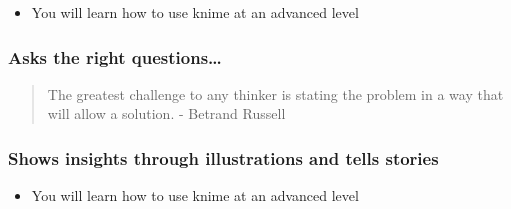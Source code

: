 \begin{itemize}
\tightlist
\item
  You will learn how to use knime at an advanced level
\end{itemize}

\hypertarget{asks-the-right-questions}{%
\subsubsection{Asks the right
questions\ldots{}}\label{asks-the-right-questions}}

\begin{quote}
The greatest challenge to any thinker is stating the problem in a way
that will allow a solution. - Betrand Russell
\end{quote}

\hypertarget{shows-insights-through-illustrations-and-tells-stories}{%
\subsubsection{Shows insights through illustrations and tells
stories}\label{shows-insights-through-illustrations-and-tells-stories}}

\begin{itemize}
\tightlist
\item
  You will learn how to use knime at an advanced level
\end{itemize}
